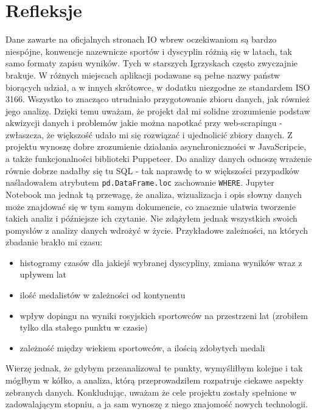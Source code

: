 \documentclass[a4paper,11pt]{article}
\begin{document}
\section{Refleksje}
    Dane zawarte na oficjalnych stronach IO wbrew oczekiwaniom są bardzo
    niespójne, konwencje nazewnicze sportów i dyscyplin różnią się w latach,
    tak samo formaty zapisu wyników. Tych w starszych Igrzyskach często zwyczajnie
    brakuje. W różnych miejscach aplikacji podawane są pełne nazwy państw biorących
    udział, a w innych skrótowce, w dodatku niezgodne ze standardem ISO 3166. 
    Wszystko to znacząco utrudniało przygotowanie zbioru danych, jak również jego
    analizę. \hfill \break
    Dzięki temu uważam, że projekt dał mi solidne zrozumienie podstaw 
    akwizycji danych i problemów jakie można napotkać przy web-scrapingu - zwłaszcza,
    że większość udało mi się rozwiązać i ujednolicić zbiory danych. 
    Z projektu wynoszę dobre zrozumienie działania asynchroniczności w JavaScripcie,
    a także funkcjonalności biblioteki Puppeteer. \hfill \break
    Do analizy danych odnoszę wrażenie równie dobrze nadałby się tu SQL - tak
    naprawdę to w większości przypadków naśladowałem atrybutem \verb|pd.DataFrame.loc|
    zachowanie \verb|WHERE|. Jupyter Notebook ma jednak tą przewagę, że analiza, 
    wizualizacja i opis słowny danych może znajdować się w tym samym dokumencie,
    co znacznie ułatwia tworzenie takich analiz i późniejsze ich czytanie. \hfill \break
    Nie zdążyłem jednak wszystkich swoich pomysłów z analizy danych wdrożyć w
    życie. Przykładowe zależności, na których zbadanie brakło mi czasu:
    \begin{itemize}
        \item histogramy czasów dla jakiejś wybranej dyscypliny, zmiana wyników
        wraz z upływem lat
        \item ilość medalistów w zależności od kontynentu
        \item wpływ dopingu na wyniki rosyjskich sportowców na przestrzeni lat
        (zrobiłem tylko dla stałego punktu w czasie)
        \item zależność między wiekiem sportowców, a ilością zdobytych medali
    \end{itemize}
    Wierzę jednak, że gdybym przeanalizował te punkty, wymyśliłbym kolejne i tak
    mógłbym w kółko, a analiza, którą przeprowadziłem rozpatruje ciekawe aspekty
    zebranych danych. Konkludując, uważam że cele projektu zostały spełnione w 
    zadowalającym stopniu, a ja sam wynoszę z niego znajomość nowych technologii.
\end{document}
